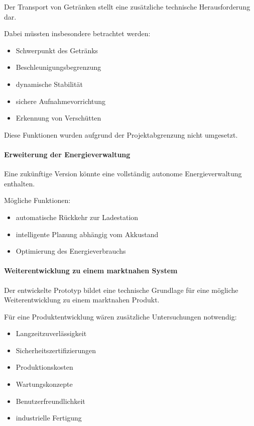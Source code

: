Der Transport von Getränken stellt eine zusätzliche technische
Herausforderung dar.

Dabei müssten insbesondere betrachtet werden:

\begin{itemize}
\tightlist
\item
  Schwerpunkt des Getränks
\item
  Beschleunigungsbegrenzung
\item
  dynamische Stabilität
\item
  sichere Aufnahmevorrichtung
\item
  Erkennung von Verschütten
\end{itemize}

Diese Funktionen wurden aufgrund der Projektabgrenzung nicht umgesetzt.

\paragraph{Erweiterung der
Energieverwaltung}\label{erweiterung-der-energieverwaltung}

Eine zukünftige Version könnte eine vollständig autonome
Energieverwaltung enthalten.

Mögliche Funktionen:

\begin{itemize}
\tightlist
\item
  automatische Rückkehr zur Ladestation
\item
  intelligente Planung abhängig vom Akkustand
\item
  Optimierung des Energieverbrauchs
\end{itemize}

\paragraph{Weiterentwicklung zu einem marktnahen
System}\label{weiterentwicklung-zu-einem-marktnahen-system}

Der entwickelte Prototyp bildet eine technische Grundlage für eine
mögliche Weiterentwicklung zu einem marktnahen Produkt.

Für eine Produktentwicklung wären zusätzliche Untersuchungen notwendig:

\begin{itemize}
\tightlist
\item
  Langzeitzuverlässigkeit
\item
  Sicherheitszertifizierungen
\item
  Produktionskosten
\item
  Wartungskonzepte
\item
  Benutzerfreundlichkeit
\item
  industrielle Fertigung
\end{itemize}

